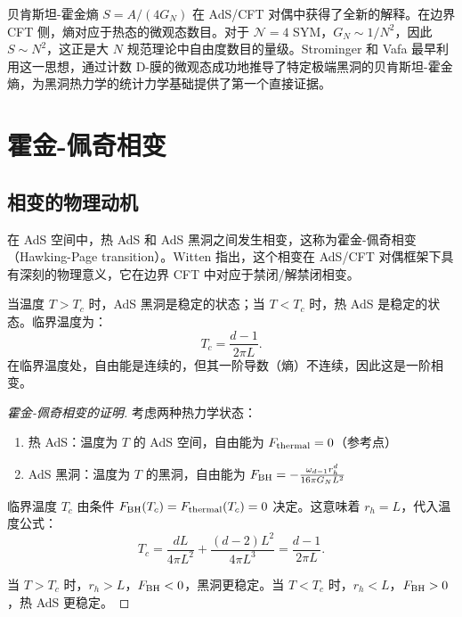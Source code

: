 \begin{remark}
贝肯斯坦-霍金熵 $S = A/(4G_N)$ 在 AdS/CFT 对偶中获得了全新的解释。在边界 CFT 侧，熵对应于热态的微观态数目。对于 $\mathcal{N}=4$ SYM，$G_N \sim 1/N^2$，因此 $S \sim N^2$，这正是大 $N$ 规范理论中自由度数目的量级。Strominger 和 Vafa 最早利用这一思想，通过计数 D-膜的微观态成功地推导了特定极端黑洞的贝肯斯坦-霍金熵，为黑洞热力学的统计力学基础提供了第一个直接证据\cite{Aharony1999}。
\end{remark}

\section{霍金-佩奇相变}

\subsection{相变的物理动机}

在 AdS 空间中，热 AdS 和 AdS 黑洞之间发生相变，这称为霍金-佩奇相变（Hawking-Page transition）\cite{Hawking1983}。Witten 指出，这个相变在 AdS/CFT 对偶框架下具有深刻的物理意义\cite{Witten1998b}，它在边界 CFT 中对应于禁闭/解禁闭相变。

\begin{theorem}[霍金-佩奇相变]
当温度 $T > T_c$ 时，AdS 黑洞是稳定的状态；当 $T < T_c$ 时，热 AdS 是稳定的状态。临界温度为：
\begin{equation}
    T_c = \frac{d-1}{2\pi L}.
\end{equation}
在临界温度处，自由能是连续的，但其一阶导数（熵）不连续，因此这是一阶相变。
\end{theorem}

\begin{proof}[霍金-佩奇相变的证明]
考虑两种热力学状态：
\begin{enumerate}
    \item 热 AdS：温度为 $T$ 的 AdS 空间，自由能为 $F_{\rm thermal} = 0$（参考点）
    \item AdS 黑洞：温度为 $T$ 的黑洞，自由能为 $F_{\rm BH} = -\frac{\omega_{d-1} r_h^d}{16\pi G_N L^2}$
\end{enumerate}

临界温度 $T_c$ 由条件 $F_{\rm BH}(T_c) = F_{\rm thermal}(T_c) = 0$ 决定。这意味着 $r_h = L$，代入温度公式：
\begin{equation}
    T_c = \frac{d L}{4\pi L^2} + \frac{(d-2) L^2}{4\pi L^3} = \frac{d-1}{2\pi L}.
\end{equation}

当 $T > T_c$ 时，$r_h > L$，$F_{\rm BH} < 0$，黑洞更稳定。当 $T < T_c$ 时，$r_h < L$，$F_{\rm BH} > 0$，热 AdS 更稳定。
\end{proof}

